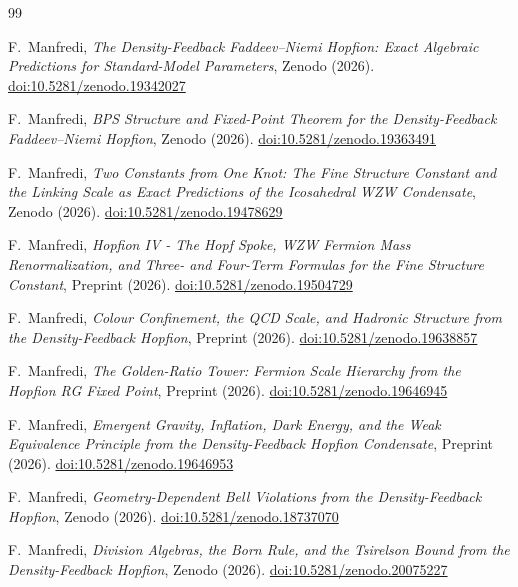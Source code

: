 \documentclass[11pt,a4paper]{article}
\theoremstyle{definition}
\theoremstyle{remark}
\begin{document}
\begin{thebibliography}{99}

F.~Manfredi,
\textit{The Density-Feedback Faddeev--Niemi Hopfion:
  Exact Algebraic Predictions for Standard-Model Parameters},
Zenodo (2026).
\href{https://doi.org/10.5281/zenodo.19342027}{doi:10.5281/zenodo.19342027}

F.~Manfredi,
\textit{BPS Structure and Fixed-Point Theorem for the
  Density-Feedback Faddeev--Niemi Hopfion},
Zenodo (2026).
\href{https://doi.org/10.5281/zenodo.19363491}{doi:10.5281/zenodo.19363491}

F.~Manfredi,
\textit{Two Constants from One Knot: The Fine Structure Constant and
  the Linking Scale as Exact Predictions of the Icosahedral WZW Condensate},
Zenodo (2026).
\href{https://doi.org/10.5281/zenodo.19478629}{doi:10.5281/zenodo.19478629}

F.~Manfredi,
\textit{Hopfion IV - The Hopf Spoke, WZW Fermion Mass Renormalization, and Three- and Four-Term Formulas for the Fine Structure Constant},
Preprint (2026).
\href{https://doi.org/10.5281/zenodo.19504729}{doi:10.5281/zenodo.19504729}

F.~Manfredi,
\textit{Colour Confinement, the QCD Scale, and Hadronic Structure
  from the Density-Feedback Hopfion},
Preprint (2026).
\href{https://doi.org/10.5281/zenodo.19638857}{doi:10.5281/zenodo.19638857}

F.~Manfredi,
\textit{The Golden-Ratio Tower: Fermion Scale Hierarchy from the Hopfion RG Fixed Point},
Preprint (2026).
\href{https://doi.org/10.5281/zenodo.19646945}{doi:10.5281/zenodo.19646945}

F.~Manfredi,
\textit{Emergent Gravity, Inflation, Dark Energy, and the Weak
  Equivalence Principle from the Density-Feedback Hopfion Condensate},
Preprint (2026).
\href{https://doi.org/10.5281/zenodo.19646953}{doi:10.5281/zenodo.19646953}

F.~Manfredi,
\textit{Geometry-Dependent Bell Violations from the Density-Feedback Hopfion},
Zenodo (2026).
\href{https://doi.org/10.5281/zenodo.18737070}{doi:10.5281/zenodo.18737070} 

F.~Manfredi,
\textit{Division Algebras, the Born Rule, and the Tsirelson Bound
  from the Density-Feedback Hopfion},
Zenodo (2026).
\href{https://doi.org/10.5281/zenodo.20075227}{doi:10.5281/zenodo.20075227}


\end{thebibliography}
\end{document}
